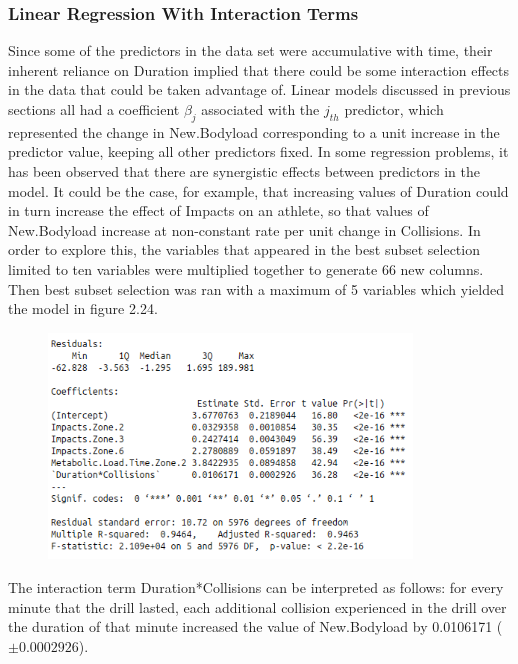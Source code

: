 \subsubsection{Linear Regression With Interaction Terms}
Since some of the predictors in the data set were accumulative with time, their inherent reliance on Duration implied that there could be some interaction effects in the data that could be taken advantage of. Linear models discussed in previous sections all had a coefficient $\beta_j$ associated with the $j_{th}$ predictor, which represented the change in New.Bodyload corresponding to a unit increase in the predictor value, keeping all other predictors fixed. In some regression problems, it has been observed that there are synergistic effects between predictors in the model. It could be the case, for example, that increasing values of Duration could in turn increase the effect of Impacts on an athlete, so that values of New.Bodyload increase at non-constant rate per unit change in Collisions. In order to explore this, the variables that appeared in the best subset selection limited to ten variables were multiplied together to generate 66 new columns. Then best subset selection was ran with a maximum of 5 variables which yielded the model in figure 2.24.
\begin{figure}[h]
	\centering
	\includegraphics[width=.6\linewidth, height=6cm]{Images/InteractionModelBestSubset.png}
\end{figure}
\break\hfill
The interaction term Duration*Collisions can be interpreted as follows: for every minute that the drill lasted, each additional collision experienced in the drill over the duration of that minute increased the value of New.Bodyload by 0.0106171 ($\pm 0.0002926$).

